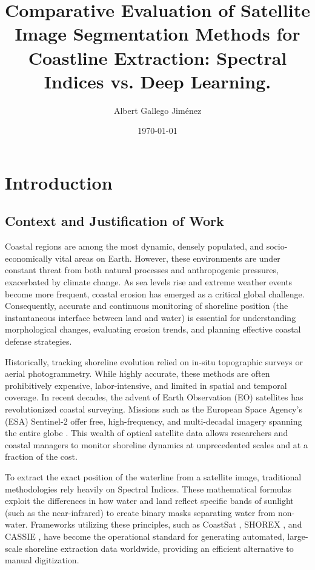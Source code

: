 ﻿\documentclass[ENG]{TFUOC}%
\title{Comparative Evaluation of Satellite Image Segmentation Methods for Coastline Extraction: Spectral Indices vs. Deep Learning.}
\author{Albert Gallego Jiménez}
\date{\today}
\begin{document}
\estructura

\tableofcontents

\listoffigures

\listoftables




\chapter{Introduction}

\section{Context and Justification of Work}

Coastal regions are among the most dynamic, densely populated, and socio-economically vital areas on Earth. However, these environments are under constant threat from both natural processes and anthropogenic pressures, exacerbated by climate change. As sea levels rise and extreme weather events become more frequent, coastal erosion has emerged as a critical global challenge. Consequently, accurate and continuous monitoring of shoreline position (the instantaneous interface between land and water) is essential for understanding morphological changes, evaluating erosion trends, and planning effective coastal defense strategies.

Historically, tracking shoreline evolution relied on in-situ topographic surveys or aerial photogrammetry. While highly accurate, these methods are often prohibitively expensive, labor-intensive, and limited in spatial and temporal coverage. In recent decades, the advent of Earth Observation (EO) satellites has revolutionized coastal surveying. Missions such as the European Space Agency's (ESA) Sentinel-2 offer free, high-frequency, and multi-decadal imagery spanning the entire globe \citep{vitousek_future_2023}. This wealth of optical satellite data allows researchers and coastal managers to monitor shoreline dynamics at unprecedented scales and at a fraction of the cost.

To extract the exact position of the waterline from a satellite image, traditional methodologies rely heavily on Spectral Indices. These mathematical formulas exploit the differences in how water and land reflect specific bands of sunlight (such as the near-infrared) to create binary masks separating water from non-water. Frameworks utilizing these principles, such as CoastSat \citep{vos_coastsat_2019}, SHOREX \citep{sanchez-garcia_efficient_2020}, and CASSIE \citep{almeida_coastal_2021}, have become the operational standard for generating automated, large-scale shoreline extraction data worldwide, providing an efficient alternative to manual digitization.
\end{document}
